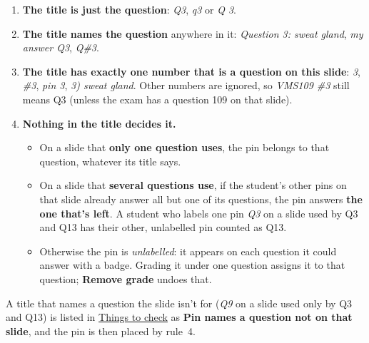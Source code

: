 \begin{enumerate}[topsep=2pt, itemsep=2pt]
\item \textbf{The title is just the question}: \emph{Q3}, \emph{q3} or \emph{Q 3}.
\item \textbf{The title names the question} anywhere in it: \emph{Question 3: sweat gland}, \emph{my answer Q3}, \emph{Q\#3}.
\item \textbf{The title has exactly one number that is a question on this slide}: \emph{3}, \emph{\#3}, \emph{pin 3}, \emph{3) sweat gland}. Other numbers are ignored, so \emph{VMS109 \#3} still means Q3 (unless the exam has a question 109 on that slide).
\item \textbf{Nothing in the title decides it.}
\begin{itemize}[topsep=1pt]
\item On a slide that \textbf{only one question uses}, the pin belongs to that question, whatever its title says.
\item On a slide that \textbf{several questions use}, if the student's other pins on that slide already answer all but one of its questions, the pin answers \textbf{the one that's left}. A student who labels one pin \emph{Q3} on a slide used by Q3 and Q13 has their other, unlabelled pin counted as Q13.
\item Otherwise the pin is \emph{unlabelled}: it appears on each question it could answer with a  badge. Grading it under one question assigns it to that question; \textbf{Remove grade} undoes that.
\end{itemize}
\end{enumerate}

A title that names a question the slide isn't for (\emph{Q9} on a slide used only by Q3 and Q13) is listed in \hyperref[sec:getting-started:things-to-check]{Things to check} as \textbf{Pin names a question not on that slide}, and the pin is then placed by rule~4.

